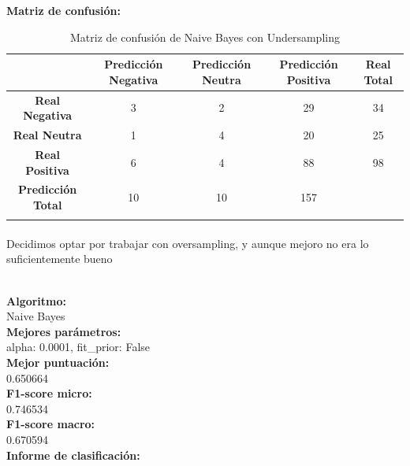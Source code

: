 \documentclass{report}
\begin{document}
{\begin{center}
{                    \textbf{Matriz de confusión: }


                    \begin{longtable}{|c|c|c|c|c|}
                    \hline
                     & \textbf{Predicción Negativa} & \textbf{Predicción Neutra} & \textbf{Predicción Positiva} & \textbf{Real Total} \\ \hline
                    \endhead
                    \textbf{Real Negativa} & 3 & 2 & 29 & 34\\ \hline
                    \textbf{Real Neutra} & 1 & 4 & 20 & 25\\ \hline
                    \textbf{Real Positiva} & 6 & 4 & 88 & 98\\ \hline
                    \textbf{Predicción Total} & 10 & 10 & 157 & \\
                    \hline
                    \caption{Matriz de confusión de Naive Bayes con Undersampling}
                    \end{longtable}
                    }
                    \end{center}
                \paragraph*{}{
                    Decidimos optar por trabajar con oversampling, y aunque mejoro no era lo suficientemente bueno \color{orange}{Puntuacion media:}
                }
                     \\
                    \phantom{}
                    \\
                    \begin{center}
                    {
                    \textbf{Algoritmo: }
                    \\
                    Naive Bayes
                    \\
                    \textbf{Mejores parámetros: }
                    \\
                    alpha: 0.0001, fit\_prior: False
                    \\
                    \textbf{Mejor puntuación: }
                    \\
                    0.650664
                    \\
                    \textbf{F1-score micro: }
                    \\
                    0.746534
                    \\
                    \textbf{F1-score macro: }
                    \\
                    0.670594
                    \\
                    \textbf{Informe de clasificación: }

}
\end{center}}
\end{document}
